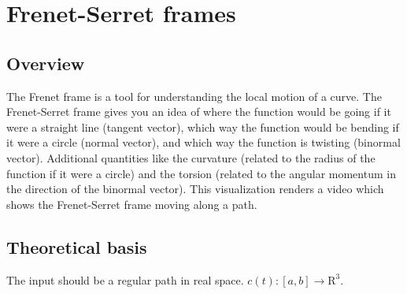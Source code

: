 \section{Frenet-Serret frames}

\subsection*{Overview}

The Frenet frame is a tool for understanding the local motion of a curve. The Frenet-Serret frame gives you an idea of where the function would be going if it were a straight line (tangent vector), which way the function would be bending if it were a circle (normal vector), and which way the function is twisting (binormal vector). Additional quantities like the curvature (related to the radius of the function if it were a circle) and the torsion (related to the angular momentum in the direction of the binormal vector). This visualization renders a video which shows the Frenet-Serret frame moving along a path.

\subsection*{Theoretical basis}

The input should be a regular path in real space. \(c(t) : [a, b] \to \mathrm R^3\).


